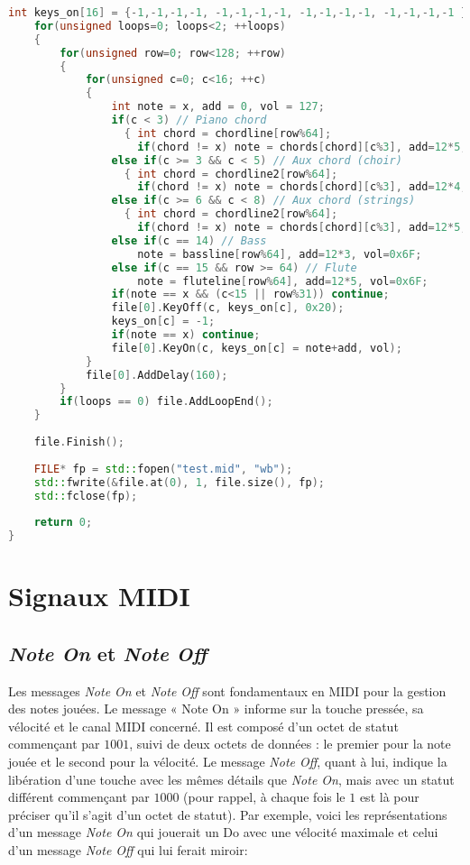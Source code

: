\documentclass[a4paper]{report}
\begin{document}
\begin{lstlisting}[language=C++, caption=CPP MIDI,captionpos=b]
    int keys_on[16] = {-1,-1,-1,-1, -1,-1,-1,-1, -1,-1,-1,-1, -1,-1,-1,-1 };
    for(unsigned loops=0; loops<2; ++loops)
    {
        for(unsigned row=0; row<128; ++row)
        {
            for(unsigned c=0; c<16; ++c)
            {
                int note = x, add = 0, vol = 127;
                if(c < 3) // Piano chord
                  { int chord = chordline[row%64];
                    if(chord != x) note = chords[chord][c%3], add=12*5, vol=0x4B; }
                else if(c >= 3 && c < 5) // Aux chord (choir)
                  { int chord = chordline2[row%64];
                    if(chord != x) note = chords[chord][c%3], add=12*4, vol=0x50; }
                else if(c >= 6 && c < 8) // Aux chord (strings)
                  { int chord = chordline2[row%64];
                    if(chord != x) note = chords[chord][c%3], add=12*5, vol=0x45; }
                else if(c == 14) // Bass
                    note = bassline[row%64], add=12*3, vol=0x6F;
                else if(c == 15 && row >= 64) // Flute
                    note = fluteline[row%64], add=12*5, vol=0x6F;
                if(note == x && (c<15 || row%31)) continue;
                file[0].KeyOff(c, keys_on[c], 0x20);
                keys_on[c] = -1;
                if(note == x) continue;
                file[0].KeyOn(c, keys_on[c] = note+add, vol);
            }
            file[0].AddDelay(160);
        }
        if(loops == 0) file.AddLoopEnd();
    }
    
    file.Finish();
    
    FILE* fp = std::fopen("test.mid", "wb");
    std::fwrite(&file.at(0), 1, file.size(), fp);
    std::fclose(fp);
    
    return 0;
}
\end{lstlisting}

\chapter{Signaux MIDI}\label{appendix:midi}

\section*{\textit{Note On} et \textit{Note Off}}
Les messages \textit{Note On} et \textit{Note Off} sont fondamentaux en MIDI pour la gestion des notes jouées. Le message « Note On » informe sur la touche pressée, sa vélocité et le canal MIDI concerné. Il est composé d'un octet de statut commençant par $1001$, suivi de deux octets de données : le premier pour la note jouée et le second pour la vélocité. Le message \textit{Note Off}, quant à lui, indique la libération d'une touche avec les mêmes détails que \textit{Note On}, mais avec un statut différent commençant par $1000$ (pour rappel, à chaque fois le $1$ est là pour préciser qu'il s'agit d'un octet de statut).
Par exemple, voici les représentations d'un message \textit{Note On} qui jouerait un Do avec une vélocité maximale et celui d'un message \textit{Note Off} qui lui ferait miroir:
\end{document}
